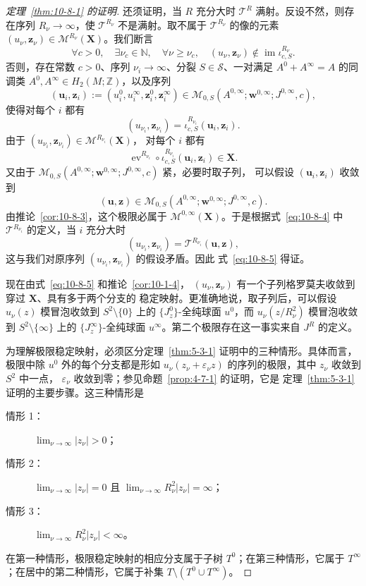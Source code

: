 \begin{proof}[定理~\ref{thm:10-8-1} 的证明]
还须证明，当 $R$ 充分大时 $\mathcal T^R$ 满射。反设不然，则存在序列
$R_\nu\to\infty$，使 $\mathcal T^{R_\nu}$ 不是满射。取不属于
$\mathcal T^{R_\nu}$ 的像的元素
$(u_\nu,\mathbf z_\nu)\in\mathcal M^{R_\nu}(\mathbf X)$。我们断言
\begin{equation}\label{eq:10-8-5}
  \forall c>0,\quad\exists\nu_c\in\mathbb N,\quad
  \forall\nu\geq\nu_c,\quad
  (u_\nu,\mathbf z_\nu)\notin\operatorname{im}\iota_{c,S}^{R_\nu}.
\end{equation}
否则，存在常数 $c>0$、序列 $\nu_i\to\infty$、分裂 $S\in\mathcal S$、一对满足
$A^0+A^\infty=A$ 的同调类 $A^0,A^\infty\in H_2(M;\mathbb Z)$，以及序列
\[
  (\mathbf u_i,\mathbf z_i):=
  (u_i^0,u_i^\infty,\mathbf z_i^0,\mathbf z_i^\infty)
  \in\mathcal M_{0,S}(A^{0,\infty};\mathbf w^{0,\infty};J^{0,\infty},c),
\]
使得对每个 $i$ 都有
\[
  (u_{\nu_i},\mathbf z_{\nu_i})
  =\iota_{c,S}^{R_{\nu_i}}(\mathbf u_i,\mathbf z_i).
\]
由于 $(u_{\nu_i},\mathbf z_{\nu_i})\in\mathcal M^{R_{\nu_i}}(\mathbf X)$，
对每个 $i$ 都有
\[
  \operatorname{ev}^{R_{\nu_i}}\circ
  \iota_{c,S}^{R_{\nu_i}}(\mathbf u_i,\mathbf z_i)\in\mathbf X.
\]
又由于
$\mathcal M_{0,S}(A^{0,\infty};\mathbf w^{0,\infty};J^{0,\infty},c)$ 紧，必要时取子列，
可以假设 $(\mathbf u_i,\mathbf z_i)$ 收敛到
\[
  (\mathbf u,\mathbf z)
  \in\mathcal M_{0,S}(A^{0,\infty};\mathbf w^{0,\infty};J^{0,\infty},c).
\]
由推论~\ref{cor:10-8-3}，这个极限必属于
$\mathcal M^{0,\infty}(\mathbf X)$。于是根据式~\eqref{eq:10-8-4} 中
$\mathcal T^{R_{\nu_i}}$ 的定义，当 $i$ 充分大时
\[
  (u_{\nu_i},\mathbf z_{\nu_i})
  =\mathcal T^{R_{\nu_i}}(\mathbf u,\mathbf z),
\]
这与我们对原序列 $(u_{\nu_i},\mathbf z_{\nu_i})$ 的假设矛盾。因此
式~\eqref{eq:10-8-5} 得证。

现在由式~\eqref{eq:10-8-5} 和推论~\ref{cor:10-1-4}，
$(u_\nu,\mathbf z_\nu)$ 有一个子列格罗莫夫收敛到穿过 $\mathbf X$、具有多于两个分支的
稳定映射。更准确地说，取子列后，可以假设 $u_\nu(z)$ 模冒泡收敛到
$S^2\setminus\{0\}$ 上的 $\{J_z^0\}$-全纯球面 $u^0$，而
$u_\nu(z/R_\nu^2)$ 模冒泡收敛到 $S^2\setminus\{\infty\}$ 上的
$\{J_z^\infty\}$-全纯球面 $u^\infty$。第二个极限存在这一事实来自 $J^R$ 的定义。

为理解极限稳定映射，必须区分定理~\ref{thm:5-3-1} 证明中的三种情形。具体而言，
极限中除 $u^0$ 外的每个分支都是形如
$u_\nu(z_\nu+\varepsilon_\nu z)$ 的序列的极限，其中 $z_\nu$ 收敛到 $S^2$ 中一点，
$\varepsilon_\nu$ 收敛到零；参见命题~\ref{prop:4-7-1} 的证明，它是
定理~\ref{thm:5-3-1} 证明的主要步骤。这三种情形是
\begin{description}
\item[情形 1：] $\displaystyle\lim_{\nu\to\infty}|z_\nu|>0$；
\item[情形 2：] $\displaystyle\lim_{\nu\to\infty}|z_\nu|=0$ 且
$\displaystyle\lim_{\nu\to\infty}R_\nu^2|z_\nu|=\infty$；
\item[情形 3：] $\displaystyle\lim_{\nu\to\infty}R_\nu^2|z_\nu|<\infty$。
\end{description}
在第一种情形，极限稳定映射的相应分支属于子树 $T^0$；在第三种情形，它属于
$T^\infty$；在居中的第二种情形，它属于补集 $T\setminus(T^0\cup T^\infty)$。


\end{proof}
